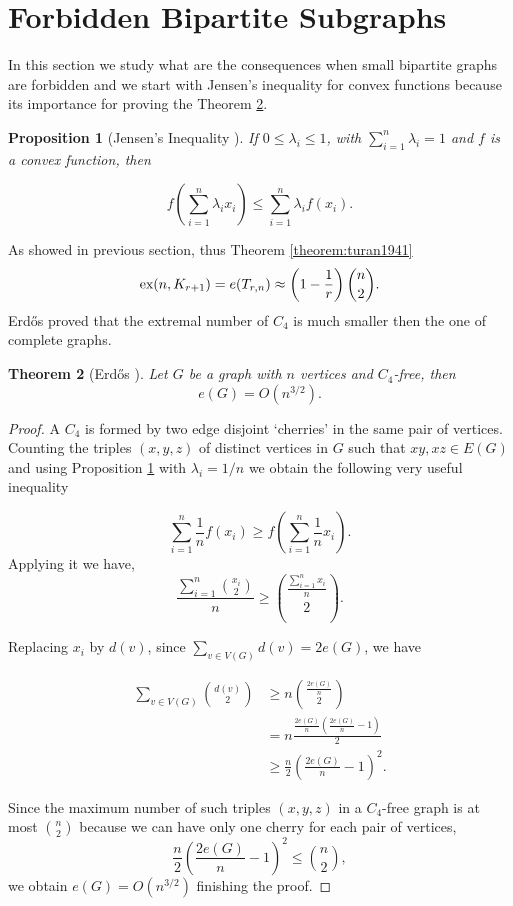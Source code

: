\documentclass[12pt,twoside,a4paper,bibliography=totocnumbered]{book}
\numberwithin{equation}{section}
\newtheorem{theorem}             {Theorem}[section]
\newtheorem{proposition}[theorem] {Proposition}
\theoremstyle{remark}
\def\ex{\mathop{\text{\rm ex}}\nolimits}
\begin{document}
\section{Forbidden Bipartite Subgraphs}
In this section we study what are the consequences when small bipartite graphs are forbidden and we start with Jensen's inequality for convex functions because its importance for proving the Theorem \ref{theorem: Erdos,1938}.
\begin{proposition}[{Jensen's Inequality \cite{Je06}}]\label{prep:jensen}
 If $0\leq \lambda_i \leq 1$, with $\sum_{i=1}^n \lambda_i = 1$ and $f$ is a convex function, then

$$
f \left( \sum_{i=1}^n \lambda_i x_i\right) \leq \sum_{i=1}^n \lambda_i f (x_i).
$$
\end{proposition}
As showed in previous section, thus Theorem \ref{theorem:turan1941}
$$ \ex (n,K_{r+1}) = e(T_{r,n}) \approx \left( 1-\frac{1}{r}\right) \binom{n}{2} .$$
Erd\H{o}s proved that the extremal number of $C_4$ is much smaller then the one of complete graphs.
 
\begin{theorem}[{Erd\H{o}s \cite{Er38}}] \label{theorem: Erdos,1938} Let $G$ be a graph with $n$ vertices and $C_4$-free, then
$$e(G) = O(n^{3/2}).$$
\end{theorem}

\begin{proof}
A $C_4$ is formed by two edge disjoint `cherries' in the same pair of vertices. Counting the triples $(x,y,z)$ of distinct vertices in $G$ such that $xy, xz \in E(G)$ and using Proposition \ref{prep:jensen} with $\lambda_i = 1/n$ we obtain the following very useful inequality

$$ \sum_{i=1}^n \frac{1}{n} f\left(x_i\right) \geq f\left(\sum_{i=1}^n \frac{1}{n} x_i\right).$$
Applying it we have,
$$ \frac{\sum_{i=1}^n \binom{x_i}{2}}{n} \geq \binom{\frac{\sum_{i=1}^n x_i}{n}}{2}.$$

Replacing $x_i$ by $d(v)$, since $\sum_{v \in V(G)} d(v) = 2e(G)$, we have

\begin{align*}
\sum_{v \in V(G)} \binom{d(v)}{2} &\geq n \binom{\frac{2e(G)}{n}}{2}\\
&= n\frac{\frac{2e(G)}{n}\left( \frac{2e(G)}{n}-1\right)}{2} \\
&\geq \frac{n}{2} \left( \frac{2e(G)}{n} - 1 \right)^2.
\end{align*}

Since the maximum number of such triples $(x,y,z)$ in a $C_4$-free graph is at most $\binom{n}{2}$ because we can have only one cherry for each pair of vertices,
$$ \frac{n}{2}\left(\frac{2e(G)}{n} - 1\right)^2 \leq \binom{n}{2},$$
we obtain $e(G) = O(n^{3/2})$ finishing the proof.
\end{proof}
\end{document}
